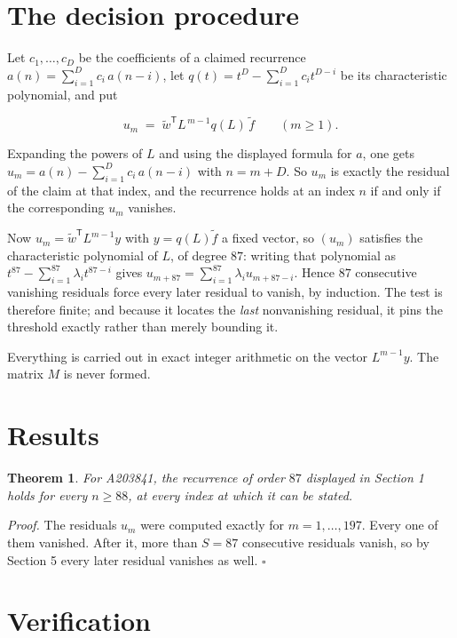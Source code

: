 \documentclass[11pt]{article}
\newtheorem{theorem}{Theorem}
\theoremstyle{definition}
\begin{document}
\section{The decision procedure}

Let $c_1,\dots,c_D$ be the coefficients of a claimed recurrence $a(n) = \sum_{i=1}^{D} c_i\,a(n-i)$, let $q(t) = t^{D} - \sum_{i=1}^{D} c_i t^{D-i}$ be its characteristic polynomial, and put

\[u_m \;=\; \tilde w^{\mathsf T} L^{\,m-1} q(L)\,\tilde f \qquad (m \ge 1).\]

Expanding the powers of $L$ and using the displayed formula for $a$, one gets $u_m = a(n) - \sum_{i=1}^{D} c_i\,a(n-i)$ with $n = m + D$. So $u_m$ is exactly the residual of the claim at that index, and the recurrence holds at an index $n$ if and only if the corresponding $u_m$ vanishes.

Now $u_m = \tilde w^{\mathsf T} L^{m-1} y$ with $y = q(L)\tilde f$ a fixed vector, so $(u_m)$ satisfies the characteristic polynomial of $L$, of degree $87$: writing that polynomial as $t^{87} - \sum_{i=1}^{87} \lambda_i t^{87-i}$ gives $u_{m+87} = \sum_{i=1}^{87} \lambda_i u_{m+87-i}$. Hence $87$ consecutive vanishing residuals force every later residual to vanish, by induction. The test is therefore finite; and because it locates the {\itshape last} nonvanishing residual, it pins the threshold exactly rather than merely bounding it.

Everything is carried out in exact integer arithmetic on the vector $L^{m-1}y$. The matrix $M$ is never formed.

\section{Results}

\begin{theorem} For A203841, the recurrence of order $87$ displayed in Section 1 holds for every $n \ge 88$, at every index at which it can be stated.\end{theorem}

{\itshape Proof.} The residuals $u_m$ were computed exactly for $m = 1,\dots,197$. Every one of them vanished. After it, more than $S = 87$ consecutive residuals vanish, so by Section 5 every later residual vanishes as well. $\square$

\section{Verification}
\end{document}
